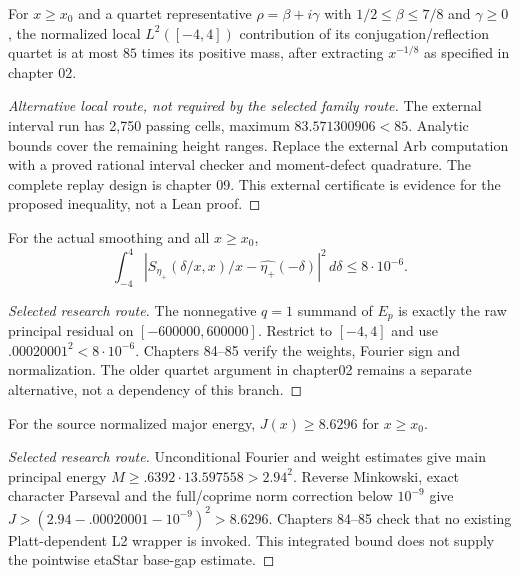 \begin{theorem}\label{quartet}\notready
For $x\ge x_0$ and a quartet representative $\rho=\beta+i\gamma$ with
$1/2\le\beta\le7/8$ and $\gamma\ge0$, the normalized local
$L^2([-4,4])$ contribution of its conjugation/reflection quartet is at most
$85$ times its positive mass,
after extracting $x^{-1/8}$ as specified in chapter 02.
\end{theorem}
\begin{proof}[Alternative local route, not required by the selected family route]
The external interval run has 2,750 passing cells, maximum $83.571300906<85$.
Analytic bounds cover the remaining height ranges. Replace the external
Arb computation with a proved rational interval checker and moment-defect
quadrature. The complete replay design is chapter 09. This external
certificate is evidence for the proposed inequality, not a Lean proof.
\end{proof}

\begin{theorem}\label{principal}\notready
For the actual smoothing and all $x\ge x_0$,
\[\int_{-4}^4\left|S_{\eta_+}(\delta/x,x)/x-
 \widehat{\eta_+}(-\delta)\right|^2\,d\delta\le8\cdot10^{-6}.\]
\end{theorem}
\begin{proof}[Selected research route]
The nonnegative $q=1$ summand of $E_p$ is exactly the raw principal
residual on $[-600000,600000]$. Restrict to $[-4,4]$ and use
$.00020001^2<8\cdot10^{-6}$. Chapters 84--85 verify the weights,
Fourier sign and normalization. The older quartet argument in chapter02
remains a separate alternative, not a dependency of this branch.
\end{proof}

\begin{theorem}\label{lowerj}\notready
For the source normalized major energy, $J(x)\ge8.6296$ for $x\ge x_0$.
\end{theorem}
\begin{proof}[Selected research route]
Unconditional Fourier and weight estimates give main principal energy
$M\ge .6392\cdot13.597558>2.94^2$. Reverse Minkowski, exact character
Parseval and the full/coprime norm correction below $10^{-9}$ give
$J>(2.94-.00020001-10^{-9})^2>8.6296$. Chapters 84--85 check that no
existing Platt-dependent L2 wrapper is invoked. This integrated bound
does not supply the pointwise etaStar base-gap estimate.
\end{proof}

